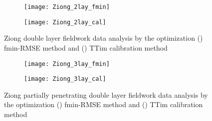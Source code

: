 \begin{figure}[h!]
	\centering
	\begin{subfigure}[b]{0.65\linewidth}
		\centering\texttt{[image: Ziong\_2lay\_fmin]}
		\captionsetup{justification=centering}		
		\caption{\label{fig:Ziong_2lay_fmin}}
		\end{subfigure}\vfill
	\begin{subfigure}[b]{0.65\linewidth}
		\centering\texttt{[image: Ziong\_2lay\_cal]}
		\captionsetup{justification=centering}		
		\caption{\label{fig:Ziong_2lay_cal}}
		\end{subfigure}
	\captionsetup{justification=centering}	
	\caption{Ziong double layer fieldwork data analysis by the optimization () fmin-RMSE method and () TTim calibration method} 
	\label{fig:Ziong_2lay_analysis}
\end{figure} 

\begin{figure}[h!]
	\centering
	\begin{subfigure}[b]{0.65\linewidth}
		\centering\texttt{[image: Ziong\_3lay\_fmin]}
		\captionsetup{justification=centering}		
		\caption{\label{fig:Ziong_3lay_fmin}}
		\end{subfigure}\vfill
	\begin{subfigure}[b]{0.65\linewidth}
		\centering\texttt{[image: Ziong\_3lay\_cal]}
		\captionsetup{justification=centering}		
		\caption{\label{fig:Ziong_3lay_cal}}
		\end{subfigure}
	\captionsetup{justification=centering}	
	\caption{Ziong partially penetrating double layer fieldwork data analysis by the optimization () fmin-RMSE method and () TTim calibration method} 
	\label{fig:Ziong_3lay_analysis}
\end{figure} 

\clearpage

